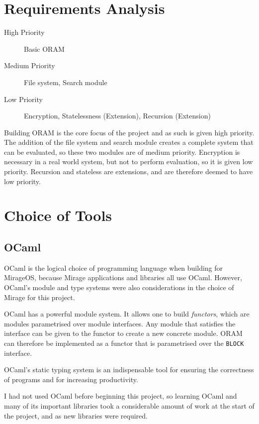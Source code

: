 \documentclass[12pt,a4paper,twoside,openright]{report}
\begin{document}
\setlength{\unitlength}{0.75mm}

\setlength{\unitlength}{0.5mm}

\section{Requirements Analysis}

\begin{description}
    \item [High Priority] Basic ORAM
    \item [Medium Priority] File system, Search module
    \item [Low Priority] Encryption, Statelessness (Extension), Recursion (Extension)
\end{description}

Building ORAM is the core focus of the project and as such is given high priority. The addition of the file system and search module creates a complete system that can be evaluated, so these two modules are of medium priority. Encryption is necessary in a real world system, but not to perform evaluation, so it is given low priority. Recursion and stateless are extensions, and are therefore deemed to have low priority.

\section{Choice of Tools}

\subsection{OCaml}

OCaml is the logical choice of programming language when building for MirageOS, because Mirage applications and libraries all use OCaml. However, OCaml's module and type systems were also considerations in the choice of Mirage for this project.

OCaml has a powerful module system. It allows one to build \emph{functors}, which are modules parametrised over module interfaces. Any module that satisfies the interface can be given to the functor to create a new concrete module. ORAM can therefore be implemented as a functor that is parametrised over the \texttt{BLOCK} interface.

OCaml's static typing system is an indispensable tool for ensuring the correctness of programs and for increasing productivity.

I had not used OCaml before beginning this project, so learning OCaml and many of its important libraries took a considerable amount of work at the start of the project, and as new libraries were required.
\end{document}
